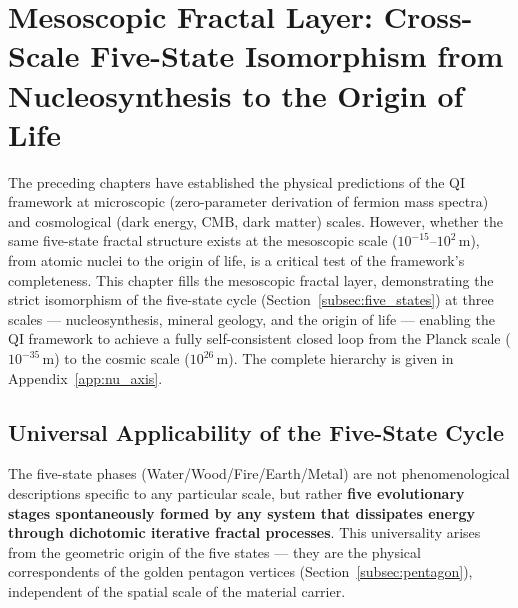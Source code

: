\documentclass[12pt,a4paper,twocolumn]{article}
\begin{document}
\section{Mesoscopic Fractal Layer: Cross-Scale Five-State Isomorphism from Nucleosynthesis to the Origin of Life}
\label{sec:mesoscopic}
\label{sec:mesoscopic}

The preceding chapters have established the physical predictions of the QI framework at microscopic (zero-parameter derivation of fermion mass spectra) and cosmological (dark energy, CMB, dark matter) scales. However, whether the same five-state fractal structure exists at the mesoscopic scale ($10^{-15}$--$10^{2}$\,m), from atomic nuclei to the origin of life, is a critical test of the framework's completeness. This chapter fills the mesoscopic fractal layer, demonstrating the strict isomorphism of the five-state cycle (Section~\ref{subsec:five_states}) at three scales --- nucleosynthesis, mineral geology, and the origin of life --- enabling the QI framework to achieve a fully self-consistent closed loop from the Planck scale ($10^{-35}$\,m) to the cosmic scale ($10^{26}$\,m). The complete hierarchy is given in Appendix~\ref{app:nu_axis}.

\subsection{Universal Applicability of the Five-State Cycle}
\label{subsec:five_states_universal}

The five-state phases (Water/Wood/Fire/Earth/Metal) are not phenomenological descriptions specific to any particular scale, but rather \textbf{five evolutionary stages spontaneously formed by any system that dissipates energy through dichotomic iterative fractal processes}. This universality arises from the geometric origin of the five states --- they are the physical correspondents of the golden pentagon vertices (Section~\ref{subsec:pentagon}), independent of the spatial scale of the material carrier.
\end{document}
